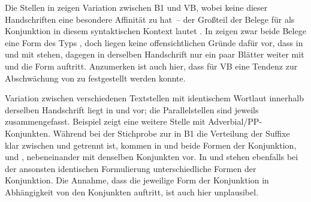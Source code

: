 Die Stellen in  zeigen Variation zwischen B1
und VB, wobei keine dieser Handschriften eine besondere Affinität zu
 hat~-- der Großteil der Belege für  als
Konjunktion in diesem syntaktischen Kontext lautet . In
 zeigen zwar beide Belege eine Form des Typs
, doch liegen keine offensichtlichen Gründe dafür vor, dass in
   und  
mit  stehen, dagegen in der\-selben Handschrift nur ein paar Blätter
weiter mit   und   die Form
 auftritt. Anzumerken ist auch hier, dass für VB eine
Tendenz zur Abschwächung von  zu  festgestellt werden
konnte.

Variation zwischen verschiedenen Textstellen mit identischem Wortlaut innerhalb
der\-selben Handschrift liegt in  und 
vor; die Parallelstellen sind jeweils zusammengefasst.
Beispiel  zeigt eine weitere Stelle mit
Adverbial/PP-Konjunkten. Während bei der
Stichprobe zur  in B1 die Verteilung der Suffixe klar
zwischen  und  getrennt ist, kommen in
 und  beide Formen der Konjunktion,
 und , nebeneinander mit denselben Konjunkten vor. In
 und  stehen ebenfalls bei der
ansonsten identischen Formulierung unterschiedliche Formen der Konjunktion. Die
Annahme, dass die jeweilige Form der Konjunktion in Abhängigkeit von den
Konjunkten auftritt, ist auch hier unplausibel.

